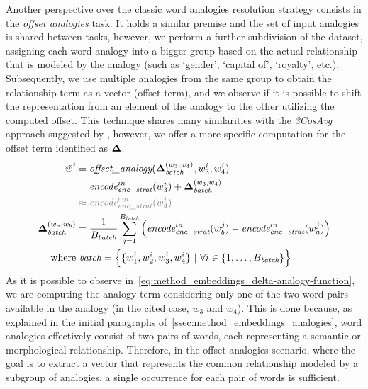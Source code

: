 Another perspective over the classic word analogies resolution strategy consists in the \emph{offset analogies} task.
It holds a similar premise and the set of input analogies is shared between tasks, however, we perform a further subdivision of the dataset, assigning each word analogy into a bigger group based on the actual relationship that is modeled by the analogy (such as `gender', `capital of', `royalty', etc.).
Subsequently, we use multiple analogies from the same group to obtain the relationship term as a vector (offset term), and we observe if it is possible to shift the representation from an element of the analogy to the other utilizing the computed offset.
This technique shares many similarities with the \emph{3CosAvg} approach suggested by \citet{drozd2016}, however, we offer a more specific computation for the offset term identified as $\bm{\mathbf{\Delta}}$.
\begin{equation}
    \label{eq:method_embeddings_delta-analogy-function}
    \begin{aligned}
        \tilde{w}^i &= \textit{offset\_analogy}(\gbm{\Delta}_{\textit{batch}}^{(w_3, w_4)}, w_3^i, w_4^i) \\
        &= {\textit{encode}}_{\textit{enc\_strat}}^{in}(w_3^i) + \gbm{\Delta}_{\textit{batch}}^{(w_3, w_4)} \\
        &\color{gray} \approx {\textit{encode}}_{\textit{enc\_strat}}^{out}(w_4^i) \\
        \gbm{\Delta}_{\textit{batch}}^{(w_a, w_b)} &= \frac{1}{B_{\textit{batch}}}\sum_{j=1}^{B_{\textit{batch}}}{\Bigl({\textit{encode}}_{\textit{enc\_strat}}^{in}(w_b^j) - {\textit{encode}}_{\textit{enc\_strat}}^{in}(w_a^j)\Bigr)} \\
        \text{where}&\ \textit{batch} = \Bigl\{ \{w_1^i, w_2^i, w_3^i, w_4^i\} \ |\ \forall i \in \{1,\ldots, B_{\textit{batch}}\} \Bigr\}
    \end{aligned}
\end{equation}
As it is possible to observe in~\cref{eq:method_embeddings_delta-analogy-function}, we are computing the analogy term considering only one of the two word pairs available in the analogy (in the cited case, $w_3$ and $w_4$).
This is done because, as explained in the initial paragraphs of~\cref{ssec:method_embeddings_analogies}, word analogies effectively consist of two pairs of words, each representing a semantic or morphological relationship.
Therefore, in the offset analogies scenario, where the goal is to extract a vector that represents the common relationship modeled by a subgroup of analogies, a single occurrence for each pair of words is sufficient.

